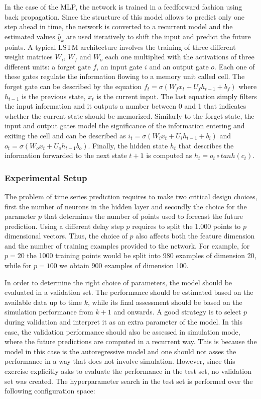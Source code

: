 \documentclass[conference,compsoc]{IEEEtran}
\begin{document}
In the case of the MLP, the network is trained in a feedforward fashion using back propagation. Since the structure of this model allows to predict only one step ahead in time, the network is converted to a recurrent model and the estimated values $\hat{y}_k$ are used iteratively to shift the input and predict the future points. A typical LSTM architecture involves the training of three different weight matrices $W_i$, $W_f$ and $W_o$ each one multiplied with the activations of three different units: a forget gate $f$, an input gate $i$ and an output gate $o$. Each one of these gates regulate the information flowing to a memory unit called cell. The forget gate can be described by the equation $f_t=\sigma(W_fx_t+U_fh_{t-1}+b_f)$ where $h_{t-1}$ is the previous state, $x_t$ is the current input. The last equation simply filters the input information and it outputs a number between 0 and 1 that indicates whether the current state should be memorized. Similarly to the forget state, the input and output gates model the significance of the information entering and exiting the cell and can be described as $i_t = \sigma(W_ix_t+U_ih_{t-1}+b_i)$ and $o_t=\sigma(W_{o}x_{t}+U_{o}h_{t-1}b_o)$. Finally, the hidden state $h_t$ that describes the information forwarded to the next state $t+1$ is computed as $h_t=o_t\circ tanh(c_t)$.
 
 
\subsubsection{Experimental Setup} 
The problem of time series prediction requires to make two critical design choices, first the number of neurons in the hidden layer and secondly the choice for the parameter $p$ that determines the number of points used to forecast the future prediction. Using a different delay step $p$ requires to split the 1.000 points to $p$ dimensional vectors. Thus, the choice of $p$ also affects both the feature dimension and the number of training examples provided to the network. For example, for $p=20$ the 1000 training points would be split into 980 examples of dimension 20, while for $p=100$ we obtain 900 examples of dimension 100. 

In order to determine the right choice of parameters, the model should be evaluated in a validation set. The performance should be estimated based on the available data up to time $k$, while its final assessment should be based on the simulation performance from ${k+1}$ and onwards. A good strategy is to select $p$ during validation and interpret it as an extra parameter of the model. In this case, the validation performance should also be assessed in simulation mode, where the future predictions are computed in a recurrent way. This is because the model in this case is the autoregressive model and one should not asses the performance in a way that does not involve simulation. However, since this exercise explicitly asks to evaluate the performance in the test set, no validation set was created. The hyperparameter search in the test set is performed over the following configuration space:
 
\end{document}
